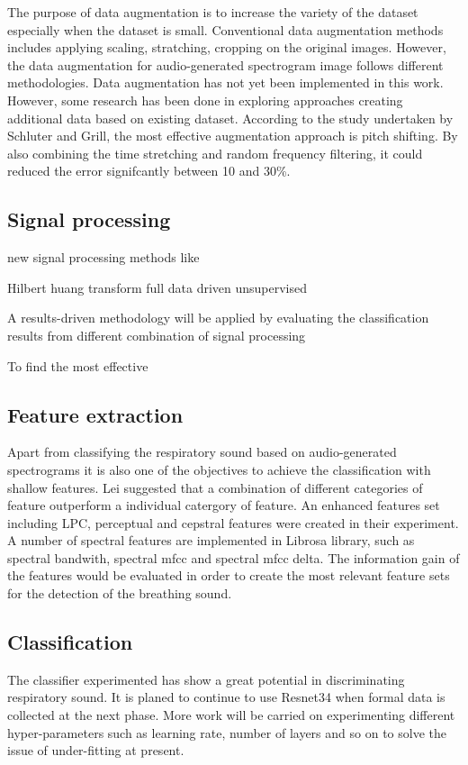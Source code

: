 The purpose of data augmentation is to increase the variety of the dataset especially when the dataset is small. Conventional data augmentation methods includes applying scaling, stratching, cropping on the original images. However, the data augmentation for audio-generated spectrogram image follows different methodologies. Data augmentation has not yet been implemented in this work. However, some research has been done in exploring approaches creating additional data based on existing dataset.\cite{Cho2017DeepBreathSettings} \cite{Schluter2015ExploringNetworks} According to the study undertaken by Schluter and Grill, the most effective augmentation approach is pitch shifting. By also combining the time stretching and random frequency filtering, it could reduced the error signifcantly between 10 and 30\%.\cite{Schluter2015ExploringNetworks}

\subsection{Signal processing}
new signal processing methods like 

Hilbert huang transform full data driven unsupervised

A results-driven methodology will be applied by evaluating the classification results from different combination of signal processing 

To find the most effective 

\subsection{Feature extraction}
Apart from classifying the respiratory sound based on audio-generated spectrograms it is also one of the objectives to achieve the classification with shallow features. Lei suggested that a combination of different categories of feature outperform a individual catergory of feature.\cite{Lei2014Content-basedFeatures} An enhanced features set including LPC, perceptual and cepstral features were created in their experiment. A number of spectral features are implemented in Librosa library, such as spectral bandwith, spectral mfcc and spectral mfcc delta. The information gain of the features would be evaluated in order to create the most relevant feature sets for the detection of the breathing sound.

\subsection{Classification}
The classifier experimented has show a great potential in discriminating respiratory sound. It is planed to continue to use Resnet34 when formal data is collected at the next phase. More work will be carried on experimenting different hyper-parameters such as learning rate, number of layers and so on to solve the issue of under-fitting at present.

